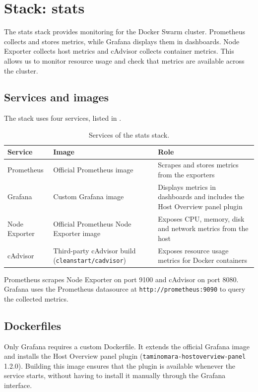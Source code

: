 \section{Stack: stats}
\label{sec:stats}
The stats stack provides monitoring for the Docker Swarm cluster.
Prometheus collects and stores metrics, while Grafana displays them
in dashboards. Node Exporter collects host metrics and cAdvisor
collects container metrics. This allows us to monitor resource usage
and check that metrics are available across the cluster.

\subsection{Services and images}
The stack uses four services, listed in .
\begin{table}[htbp]
\centering
\caption{Services of the stats stack.}
\label{tab:stats-services}
\small
\begin{tabular}{l>{\raggedright\arraybackslash}p{48mm}>{\raggedright\arraybackslash}p{60mm}}
\toprule
Service & Image & Role \\
\midrule
Prometheus & Official Prometheus image
& Scrapes and stores metrics from the exporters \\
Grafana & Custom Grafana image
& Displays metrics in dashboards and includes the Host Overview
panel plugin \\
Node Exporter & Official Prometheus Node Exporter image
& Exposes CPU, memory, disk and network metrics from
the host \\
cAdvisor & Third-party cAdvisor build (\texttt{cleanstart/cadvisor})
& Exposes resource usage metrics for Docker containers \\
\bottomrule
\end{tabular}
\end{table}

Prometheus scrapes Node Exporter on port 9100 and cAdvisor on port
8080. Grafana uses the Prometheus datasource at
\texttt{http://prometheus:9090} to query the collected metrics.

\subsection{Dockerfiles}
Only Grafana requires a custom Dockerfile. It extends the official
Grafana image and installs the Host Overview panel plugin
(\texttt{taminomara-hostoverview-panel} 1.2.0). Building this image
ensures that the plugin is available whenever the service starts,
without having to install it manually through the Grafana interface.

